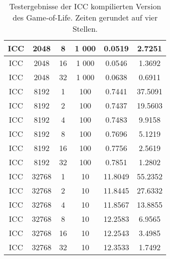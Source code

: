 \documentclass[german,plainarticle,hyperref,utf8]{zihpub}
\begin{document}
\begin{table}
\begin{center}
\begin{tabular}{||c c c c c c||}
				\hline
				ICC      & 2048  & 8         & 1 000       & 0.0519                   & 2.7251                \\
				\hline
				ICC      & 2048  & 16        & 1 000       & 0.0546                  & 1.3692                \\
				\hline
				ICC      & 2048  & 32        & 1 000       & 0.0638                  & 0.6911                \\
				\hline\hline
				ICC      & 8192  & 1         & 100         & 0.7441                   & 37.5091                \\
				\hline
				ICC      & 8192  & 2         & 100         & 0.7437                   & 19.5603                \\
				\hline
				ICC      & 8192  & 4         & 100         & 0.7483                   & 9.9158                \\
				\hline
				ICC      & 8192  & 8         & 100         & 0.7696                   & 5.1219                \\
				\hline
				ICC      & 8192  & 16        & 100         & 0.7756                   & 2.5619                \\
				\hline
				ICC      & 8192  & 32        & 100         & 0.7851                   & 1.2802                \\
				\hline\hline
				ICC      & 32768 & 1         & 10          & 11.8049                   & 55.2352                \\
				\hline
				ICC      & 32768 & 2         & 10          & 11.8445                   & 27.6332                \\
				\hline
				ICC      & 32768 & 4         & 10          & 11.8567                   & 13.8855                \\
				\hline
				ICC      & 32768 & 8         & 10          & 12.2583                   & 6.9565                \\
				\hline
				ICC      & 32768 & 16        & 10          & 12.2543                   & 3.4985                \\
				\hline
				ICC      & 32768 & 32        & 10          & 12.3533                   & 1.7492                \\
				\hline
			\end{tabular}
			\caption{\label{tab:icc}Testergebnisse der ICC kompilierten Version des Game-of-Life. Zeiten gerundet auf vier Stellen.}
		\end{center}
	\end{table}
	\clearpage
	
\end{document}
